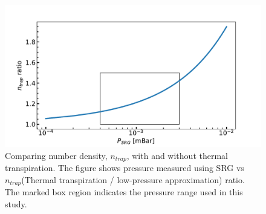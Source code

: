 \begin{figure}[!htb]
    \centering
    \includegraphics[width=1\textwidth]{figures/measurements/kinetics/numberDensity_ratio.pdf}
    \caption{Comparing number density, $n_{trap}$, with and without thermal transpiration. The figure shows pressure measured using SRG vs $n_{trap}$(Thermal transpiration / low-pressure approximation) ratio. The marked box region indicates the pressure range used in this study.}
    \label{fig:number-density-compare}

\end{figure}